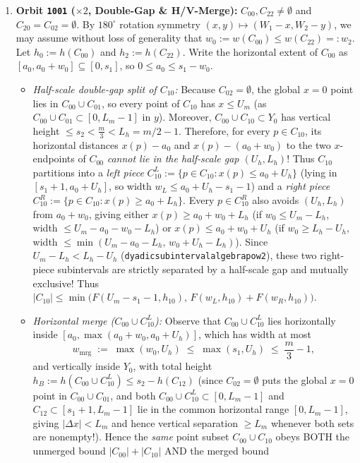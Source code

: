 \documentclass[11pt,reqno]{amsart}
\theoremstyle{plain}
\theoremstyle{definition}
\theoremstyle{remark}
\DeclareRobustCommand{\_}{\ifmmode\text{\textunderscore}\else\textunderscore\allowbreak\fi}
\begin{document}
\begin{enumerate}[label=(\arabic*),leftmargin=2em]
  \item \textbf{Orbit \texttt{1001} ($\times 2$, Double-Gap \& H/V-Merge):} $C_{00}, C_{22} \neq \emptyset$ and $C_{20} = C_{02} = \emptyset$. By $180^\circ$ rotation symmetry $(x, y) \mapsto (W_1 - x, W_2 - y)$, we may assume without loss of generality that $w_0 := w(C_{00}) \le w(C_{22}) =: w_2$. Let $h_0 := h(C_{00})$ and $h_2 := h(C_{22})$. Write the horizontal extent of $C_{00}$ as $[a_0, a_0 + w_0] \subseteq [0, s_1]$, so $0 \le a_0 \le s_1 - w_0$.
  \begin{itemize}[leftmargin=1.4em]
    \item \emph{Half-scale double-gap split of $C_{10}$:} Because $C_{02} = \emptyset$, the global $x = 0$ point lies in $C_{00} \cup C_{01}$, so every point of $C_{10}$ has $x \le U_m$ (as $C_{00} \cup C_{01} \subset [0, L_m - 1]$ in $y$). Moreover, $C_{00} \cup C_{10} \subset Y_0$ has vertical height $\le s_2 < \frac{m}{3} < L_h = m/2 - 1$. Therefore, for every $p \in C_{10}$, its horizontal distances $x(p) - a_0$ and $x(p) - (a_0 + w_0)$ to the two $x$-endpoints of $C_{00}$ \emph{cannot lie in the half-scale gap $(U_h, L_h)$}! Thus $C_{10}$ partitions into a \emph{left piece} $C_{10}^L := \{p \in C_{10} : x(p) \le a_0 + U_h\}$ (lying in $[s_1 + 1, a_0 + U_h]$, so width $w_L \le a_0 + U_h - s_1 - 1$) and a \emph{right piece} $C_{10}^R := \{p \in C_{10} : x(p) \ge a_0 + L_h\}$. Every $p \in C_{10}^R$ also avoids $(U_h, L_h)$ from $a_0 + w_0$, giving either $x(p) \ge a_0 + w_0 + L_h$ (if $w_0 \le U_m - L_h$, width $\le U_m - a_0 - w_0 - L_h$) or $x(p) \le a_0 + w_0 + U_h$ (if $w_0 \ge L_h - U_h$, width $\le \min(U_m - a_0 - L_h,\, w_0 + U_h - L_h)$). Since $U_m - L_h < L_h - U_h$ (\texttt{dyadic\_subinterval\_algebra\_pow2}), these two right-piece subintervals are strictly separated by a half-scale gap and mutually exclusive! Thus $|C_{10}| \le \min\bigl(F(U_m - s_1 - 1, h_{10}),\, F(w_L, h_{10}) + F(w_R, h_{10})\bigr)$.
    \item \emph{Horizontal merge ($C_{00} \cup C_{10}^L$):} Observe that $C_{00} \cup C_{10}^L$ lies horizontally inside $[a_0, \max(a_0 + w_0, a_0 + U_h)]$, which has width at most
    \[
      w_{\mathrm{mrg}} \;:=\; \max(w_0, U_h) \;\le\; \max(s_1, U_h) \;\le\; \frac{m}{3} - 1,
    \]
    and vertically inside $Y_0$, with total height $h_B := h(C_{00} \cup C_{10}^L) \le s_2 - h(C_{12})$ (since $C_{02} = \emptyset$ puts the global $x = 0$ point in $C_{00} \cup C_{01}$, and both $C_{00} \cup C_{10}^L \subset [0, L_m - 1]$ and $C_{12} \subset [s_1 + 1, L_m - 1]$ lie in the common horizontal range $[0, L_m - 1]$, giving $|\Delta x| < L_m$ and hence vertical separation $\ge L_m$ whenever both sets are nonempty!). Hence the \emph{same} point subset $C_{00} \cup C_{10}$ obeys BOTH the unmerged bound $|C_{00}| + |C_{10}|$ AND the merged bound

\end{itemize}
\end{enumerate}
\end{document}
